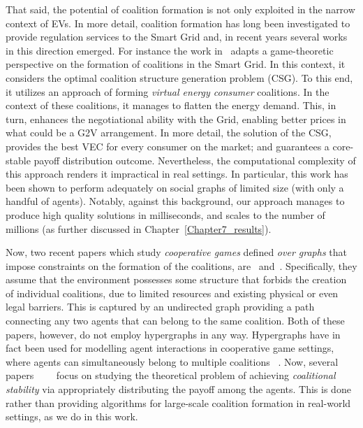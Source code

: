 That said, the potential of coalition formation is not only exploited in the narrow context of EVs. In more detail, coalition formation has long been investigated to provide regulation services to the Smart Grid and, in recent years several works in this direction emerged. For instance the work in~\cite{vinyals2012stable} adapts a game-theoretic perspective on the formation of coalitions in the Smart Grid. In this context, it considers the optimal coalition structure generation problem (CSG). To this end, it utilizes an approach of forming {\em virtual energy consumer} coalitions. In the context of these coalitions, it manages to flatten the energy demand. This, in turn, enhances the negotiational ability with the Grid, enabling better prices in what could be a G2V arrangement. In more detail, the solution of the CSG, provides the best VEC for every consumer on the market; and guarantees a core-stable payoff distribution outcome. Nevertheless, the computational complexity of this approach renders it impractical in real settings. In particular, this work has been shown to perform adequately on social graphs of limited size (with only a handful of agents). Notably, against this background, our approach manages to produce high quality solutions in milliseconds, and scales to the number of millions (as further discussed in Chapter~\ref{Chapter7_results}).

Now, two recent papers which study {\em cooperative games} defined {\em over graphs} that impose constraints on the formation of the coalitions, are~\cite{chalkiadakis2016characteristic} and~\cite{chalkiadakis2012coalitional}. Specifically, they assume that the environment possesses some structure that forbids the creation of individual coalitions, due to limited resources and existing physical or even legal barriers. This is captured by an undirected graph providing a path connecting any two agents that can belong to the same coalition.
Both of these papers, however, do not employ hypergraphs in any way. Hypergraphs have in fact been used for modelling agent interactions in cooperative game settings, where agents can simultaneously belong to multiple coalitions~\cite{jun2009hypergraph} \cite{zick2012overlapping}. Now, several papers~\cite{chalkiadakis2016characteristic}~\cite{chalkiadakis2012coalitional}~\cite{jun2009hypergraph}~\cite{zick2012overlapping} focus on studying the theoretical problem of achieving {\em coalitional stability} via appropriately distributing the payoff among the agents. This is done rather than providing algorithms for large-scale coalition formation in real-world settings, as we do in this work. 

